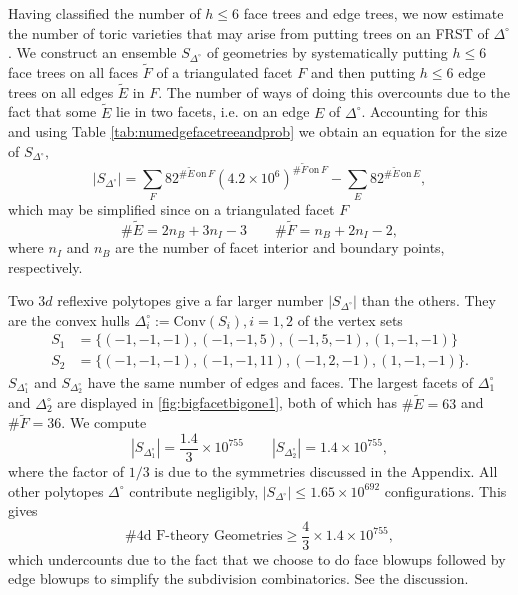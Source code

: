 \documentclass[aps,prl,twocolumn, superscriptaddress,groupedaddress,nofootinbib]{revtex4-1}
\newcommand{\sdoc}{S_{\Delta_1^\circ}}
\newcommand{\sdtc}{S_{\Delta_2^\circ}}
\begin{document}
\vspace{.5cm}
Having classified the number of $h\leq 6$ face trees and edge trees, we now estimate 
the number of toric varieties that may arise from putting trees on an FRST of 
$\Delta^\circ$. 
We construct an ensemble $S_{\Delta^\circ}$ of geometries by systematically putting $h\leq 6$ face trees on all
faces $\tilde F$ of a triangulated facet $F$ and then putting $h\leq 6$ edge trees on
all edges $\tilde E$ in $F$. The number of ways of doing this overcounts
due to the fact that some
$\tilde E$ lie in two facets, i.e. on an edge $E$ of $\Delta^\circ$. Accounting
for this and using Table \ref{tab:numedgefacetreeandprob} we obtain an equation for the size of $S_{\Delta^\circ},$
\begin{equation}
|S_{\Delta^\circ}| = \sum_F 82^{\# \tilde E \, \text{on} \, F} (4.2\times 10^6)^{\# \tilde F \, \text{on} \, F} - \sum_E 82^{\# \tilde E \, \text{on} \, E},
\end{equation}
which may be simplified since on a triangulated facet $F$
\begin{equation}
\#\tilde E = 2n_B + 3n_I - 3 \qquad \# \tilde F = n_B+2n_I-2,
\end{equation}
where $n_I$ and $n_B$ are the number of facet interior and boundary points,
respectively. 

Two $3d$ reflexive polytopes give a far larger number $|S_{\Delta^\circ}|$
than the others. They
are  the convex hulls $\Delta_i^\circ := \text{Conv}(S_i), i=1,2$ of the
vertex sets
\begin{align} 
S_1 &= \{ (-1,-1,-1),(-1,-1,5),(-1,5,-1),(1,-1,-1)\} \nonumber \\
S_2 &= \{ (-1,-1,-1),(-1,-1,11),(-1,2,-1),(1,-1,-1)\}.
\end{align}
$\sdoc$ and $\sdtc$ have the same number of edges and faces. 
The largest facets of $\Delta_1^\circ$ and $\Delta_2^\circ$ are displayed in \ref{fig:bigfacetbigone1}, 
both of which has $\# \tilde E = 63$ and $\# \tilde F=36$. We compute
\begin{equation}
|\sdoc| = \frac{1.4}{3} \times 10^{755} \qquad |\sdtc| = 1.4 \times 10^{755},
\label{eqn:sdocsdtccounts}
\end{equation}
where the factor of $1/3$ is due to the symmetries discussed in the Appendix.
All other polytopes $\Delta^\circ$ contribute negligibly, 
$|S_{\Delta^\circ}| \leq 1.65\times 10^{692}$
configurations. This gives
\begin{equation}
\text{\# 4d F-theory Geometries} \geq \frac43 \times 1.4 \times 10^{755},
\end{equation}
which undercounts due to the fact that we choose to do face blowups followed by
edge blowups to simplify the subdivision combinatorics. See the discussion.
\end{document}
